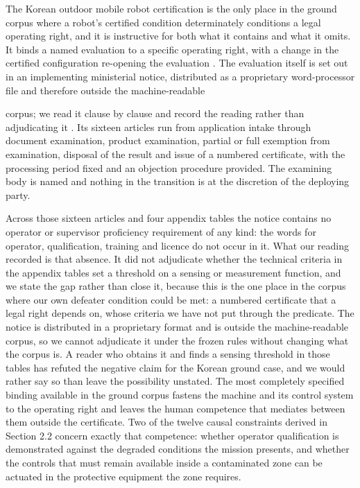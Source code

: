 The Korean outdoor mobile robot certification is the only place in the ground corpus where a robot's certified condition determinately conditions a legal operating right, and it is instructive for both what it contains and what it omits. It binds a named evaluation to a specific operating right, with a change in the certified configuration re-opening the evaluation \citep{ROKIntelligentRobotsAct}. The evaluation itself is set out in an implementing ministerial notice, distributed as a proprietary word-processor file and therefore outside the machine-readable

corpus; we read it clause by clause and record the reading rather than adjudicating it \citep{MOTIENotice2023211}. Its sixteen articles run from application intake through document examination, product examination, partial or full exemption from examination, disposal of the result and issue of a numbered certificate, with the processing period fixed and an objection procedure provided. The examining body is named and nothing in the transition is at the discretion of the deploying party.

Across those sixteen articles and four appendix tables the notice contains no operator or supervisor proficiency requirement of any kind: the words for operator, qualification, training and licence do not occur in it. What our reading recorded is that absence. It did not adjudicate whether the technical criteria in the appendix tables set a threshold on a sensing or measurement function, and we state the gap rather than close it, because this is the one place in the corpus where our own defeater condition could be met: a numbered certificate that a legal right depends on, whose criteria we have not put through the predicate. The notice is distributed in a proprietary format and is outside the machine-readable corpus, so we cannot adjudicate it under the frozen rules without changing what the corpus is. A reader who obtains it and finds a sensing threshold in those tables has refuted the negative claim for the Korean ground case, and we would rather say so than leave the possibility unstated. The most completely specified binding available in the ground corpus fastens the machine and its control system to the operating right and leaves the human competence that mediates between them outside the certificate. Two of the twelve causal constraints derived in Section 2.2 concern exactly that competence: whether operator qualification is demonstrated against the degraded conditions the mission presents, and whether the controls that must remain available inside a contaminated zone can be actuated in the protective equipment the zone requires.


